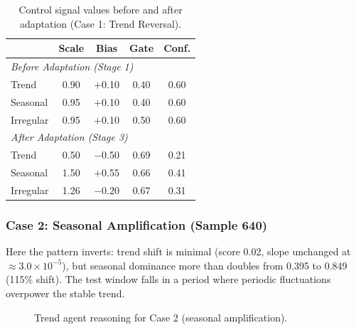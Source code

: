 \begin{table}[h!]
\centering
\small


\begin{tabular}{lcccc}
\toprule
& Scale & Bias & Gate & Conf. \\
\midrule
\multicolumn{5}{l}{\textit{Before Adaptation (Stage 1)}} \\
Trend & 0.90 & $+$0.10 & 0.40 & 0.60 \\
Seasonal & 0.95 & $+$0.10 & 0.40 & 0.60 \\
Irregular & 0.95 & $+$0.10 & 0.50 & 0.60 \\
\midrule
\multicolumn{5}{l}{\textit{After Adaptation (Stage 3)}} \\
Trend & 0.50 & $-$0.50 & 0.69 & 0.21 \\
Seasonal & 1.50 & $+$0.55 & 0.66 & 0.41 \\
Irregular & 1.26 & $-$0.20 & 0.67 & 0.31 \\
\bottomrule
\end{tabular}
\caption{Control signal values before and after adaptation (Case 1: Trend Reversal).}
\label{tab:case1_policy}
\end{table}


\subsubsection{Case 2: Seasonal Amplification (Sample 640)}

Here the pattern inverts: trend shift is minimal (score 0.02, slope unchanged at $\approx 3.0 \times 10^{-5}$), but seasonal dominance more than doubles from 0.395 to 0.849 (115\% shift). The test window falls in a period where periodic fluctuations overpower the stable trend.

\begin{figure}[h!]
\centering
{}
\caption{Trend agent reasoning for Case 2 (seasonal amplification).}
\label{fig:case2_trend}
\end{figure}

